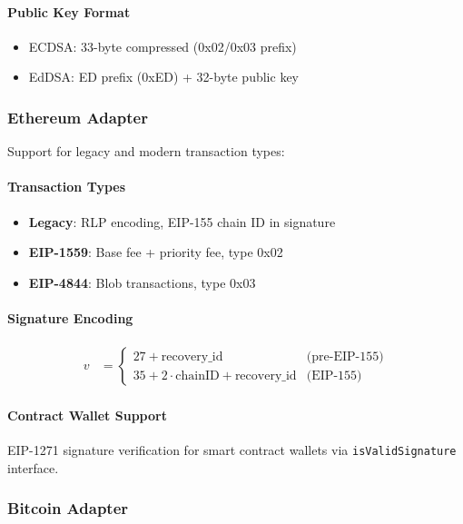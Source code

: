\documentclass[11pt,twocolumn]{article}
\begin{document}
\paragraph{Public Key Format}
\begin{itemize}
\item ECDSA: 33-byte compressed (0x02/0x03 prefix)
\item EdDSA: ED prefix (0xED) + 32-byte public key
\end{itemize}

\subsubsection{Ethereum Adapter}

Support for legacy and modern transaction types:

\paragraph{Transaction Types}
\begin{itemize}
\item \textbf{Legacy}: RLP encoding, EIP-155 chain ID in signature
\item \textbf{EIP-1559}: Base fee + priority fee, type 0x02
\item \textbf{EIP-4844}: Blob transactions, type 0x03
\end{itemize}

\paragraph{Signature Encoding}
\begin{align*}
v &= \begin{cases}
27 + \text{recovery\_id} & \text{(pre-EIP-155)} \\
35 + 2 \cdot \text{chainID} + \text{recovery\_id} & \text{(EIP-155)}
\end{cases}
\end{align*}

\paragraph{Contract Wallet Support} EIP-1271 signature verification for smart contract wallets via \texttt{isValidSignature} interface.

\subsubsection{Bitcoin Adapter}
\end{document}
